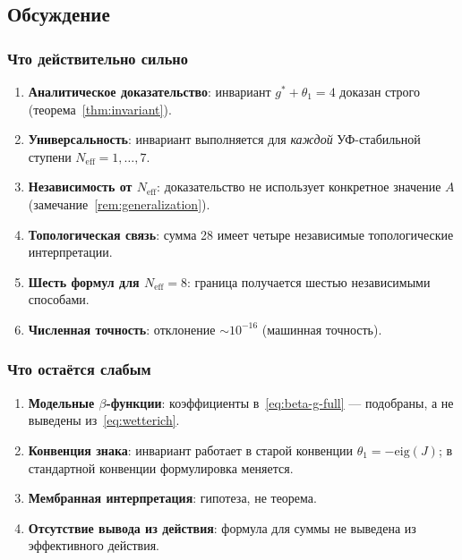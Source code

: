 \documentclass[11pt,a4paper]{article}
\theoremstyle{definition}
\begin{document}
\subsection{Обсуждение}
\label{subsec:frg-discussion}

\subsubsection{Что действительно сильно}

\begin{enumerate}
    \item \textbf{Аналитическое доказательство}: инвариант
          $g^* + \theta_1 = 4$ доказан строго (теорема~\ref{thm:invariant}).
    \item \textbf{Универсальность}: инвариант выполняется
          для \emph{каждой} УФ-стабильной ступени
          $N_{\text{eff}} = 1, \ldots, 7$.
    \item \textbf{Независимость от $N_{\text{eff}}$}: доказательство
          не использует конкретное значение $A$ (замечание~\ref{rem:generalization}).
    \item \textbf{Топологическая связь}: сумма 28 имеет четыре
          независимые топологические интерпретации.
    \item \textbf{Шесть формул для $N_{\text{eff}} = 8$}: граница
          получается шестью независимыми способами.
    \item \textbf{Численная точность}: отклонение
          $\sim 10^{-16}$ (машинная точность).
\end{enumerate}

\subsubsection{Что остаётся слабым}

\begin{enumerate}
    \item \textbf{Модельные $\beta$-функции}: коэффициенты в~\eqref{eq:beta-g-full}
          --- подобраны, а не выведены из~\eqref{eq:wetterich}.
    \item \textbf{Конвенция знака}: инвариант работает
          в старой конвенции $\theta_1 = -\mathrm{eig}(J)$;
          в стандартной конвенции формулировка меняется.
    \item \textbf{Мембранная интерпретация}: гипотеза, не теорема.
    \item \textbf{Отсутствие вывода из действия}: формула
          для суммы не выведена из эффективного действия.
\end{enumerate}
\end{document}

